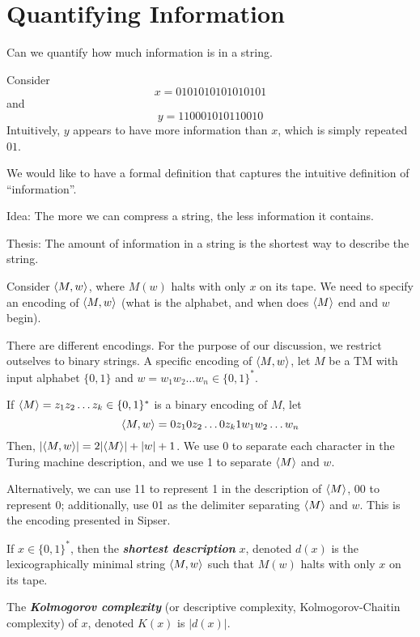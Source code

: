 \section{Quantifying Information}

Can we quantify how much information is in a string.

Consider
$$
x = 0101010101010101
$$
and
$$
y = 110001010110010
$$
Intuitively, $y$ appears to have more information than $x$, which is simply repeated $01$.

We would like to have a formal definition that captures the intuitive definition of ``information''.

Idea: The more we can compress a string, the less information it contains.

Thesis: The amount of information in a string is the shortest way to describe the string.

Consider $\langle M,w \rangle$, where $M(w)$ halts with only $x$ on its tape. We need to specify an encoding of $\langle M,w \rangle$ (what is the alphabet, and when does $\langle M \rangle$ end and $w$ begin).

There are different encodings. For the purpose of our discussion, we restrict outselves to binary strings. A specific encoding of $\langle M,w \rangle$, let $M$ be a TM with input alphabet $\{0,1\}$ and $w = w_1w_2\ldots w_n \in \{0,1\}^*$.

If $\langle M \rangle = z_1z_2\ldots z_k \in \{0,1\}^*$ is a binary encoding of $M$, let
$$
\langle M,w \rangle = 0 z_1 0 z_2 \ldots 0 z_k 1 w_1 w_2 \ldots w_n
$$ 
Then, $|\langle M,w \rangle| = 2 |\langle M \rangle| + |w| + 1$. We use 0 to separate each character in the Turing machine description, and we use 1 to separate $\langle M \rangle$ and $w$.

Alternatively, we can use 11 to represent 1 in the description of $\langle M \rangle$, 00 to represent 0; additionally, use 01 as the delimiter separating $\langle M \rangle$ and $w$. This is the encoding presented in Sipser.

\begin{definition}
    If $x \in \{0,1\}^*$, then the \textit{\textbf{shortest description}} $x$, denoted $d(x)$ is the lexicographically minimal string $\langle M,w \rangle$ such that $M(w)$ halts with only $x$ on its tape.
\end{definition}

\begin{definition}
    The \textit{\textbf{Kolmogorov complexity}} (or descriptive complexity, Kolmogorov-Chaitin complexity) of $x$, denoted $K(x)$ is $|d(x)|$.
\end{definition}

